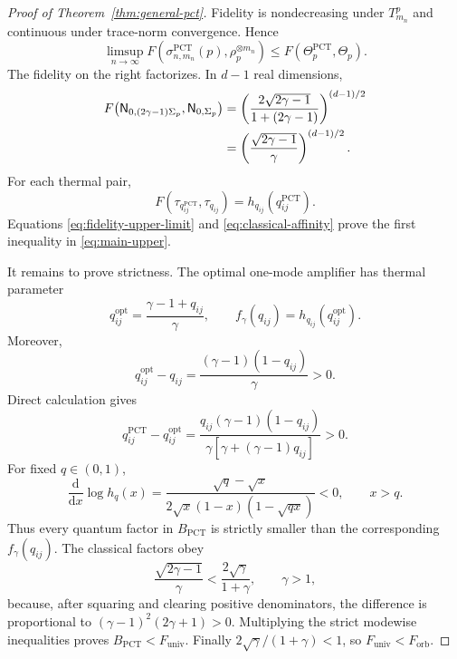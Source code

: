 \documentclass[11pt]{article}
\theoremstyle{remark}
\theoremstyle{plain}
\newcommand{\dd}{\mathrm d}
\newcommand{\ot}{\otimes}
\newcommand{\Forb}{F_{\mathrm{orb}}}
\newcommand{\Funiv}{F_{\mathrm{univ}}}
\begin{document}
\begin{proof}[Proof of Theorem~\ref{thm:general-pct}]
Fidelity is nondecreasing under \(T_{m_n}^p\) and continuous under
trace-norm convergence.  Hence
\begin{equation}\label{eq:fidelity-upper-limit}
  \limsup_{n\to\infty}
  F\!\left(
    \sigma_{n,m_n}^{\mathrm{PCT}}(p),
    \rho_p^{\ot m_n}
  \right)
  \le F(\Theta_p^{\mathrm{PCT}},\Theta_p).
\end{equation}
The fidelity on the right factorizes.  In \(d-1\) real dimensions,
\begin{align}
 F\!\left(
   \mathsf N_{0,(2\gamma-1)\Sigma_p},
   \mathsf N_{0,\Sigma_p}
 \right)
 &=\left(
   \frac{2\sqrt{2\gamma-1}}{1+(2\gamma-1)}
  \right)^{(d-1)/2}\notag\\
 &=\left(
   \frac{\sqrt{2\gamma-1}}{\gamma}
  \right)^{(d-1)/2}.
 \label{eq:classical-affinity}
\end{align}
For each thermal pair,
\[
  F(\tau_{q_{ij}^{\mathrm{PCT}}},\tau_{q_{ij}})
  =h_{q_{ij}}(q_{ij}^{\mathrm{PCT}}).
\]
Equations \eqref{eq:fidelity-upper-limit} and
\eqref{eq:classical-affinity} prove the first inequality in
\eqref{eq:main-upper}.

It remains to prove strictness.  The optimal one-mode amplifier has thermal
parameter
\[
  q_{ij}^{\mathrm{opt}}
  =\frac{\gamma-1+q_{ij}}{\gamma},
  \qquad
  f_\gamma(q_{ij})=h_{q_{ij}}(q_{ij}^{\mathrm{opt}}).
\]
Moreover,
\[
  q_{ij}^{\mathrm{opt}}-q_{ij}
  =\frac{(\gamma-1)(1-q_{ij})}{\gamma}>0.
\]
Direct calculation gives
\begin{equation}\label{eq:q-strict}
  q_{ij}^{\mathrm{PCT}}-q_{ij}^{\mathrm{opt}}
  =\frac{q_{ij}(\gamma-1)(1-q_{ij})}
         {\gamma[\gamma+(\gamma-1)q_{ij}]}>0.
\end{equation}
For fixed \(q\in(0,1)\),
\[
  \frac{\dd}{\dd x}\log h_q(x)
  =\frac{\sqrt q-\sqrt x}
         {2\sqrt x(1-x)(1-\sqrt{qx})}<0,
  \qquad x>q.
\]
Thus every quantum factor in \(B_{\mathrm{PCT}}\) is strictly smaller than
the corresponding \(f_\gamma(q_{ij})\).  The classical factors obey
\begin{equation}\label{eq:classical-strict}
  \frac{\sqrt{2\gamma-1}}{\gamma}
  <\frac{2\sqrt\gamma}{1+\gamma},
  \qquad \gamma>1,
\end{equation}
because, after squaring and clearing positive denominators, the difference
is proportional to
\((\gamma-1)^2(2\gamma+1)>0\).  Multiplying the strict modewise inequalities
proves \(B_{\mathrm{PCT}}<\Funiv\).  Finally
\(2\sqrt\gamma/(1+\gamma)<1\), so \(\Funiv<\Forb\).
\end{proof}
\end{document}
